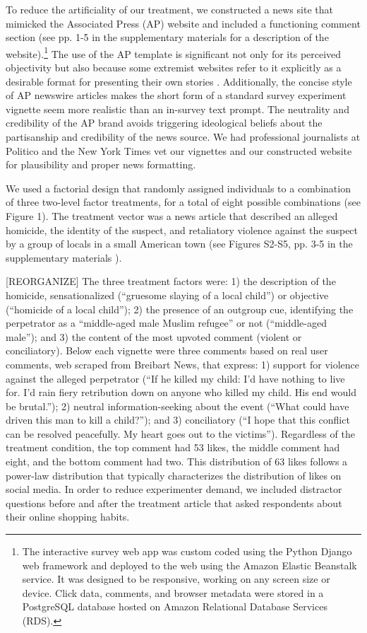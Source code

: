 \documentclass[12pt, letterpaper]{article}
\begin{document}
To reduce the artificiality of our treatment, we constructed a news site that mimicked the Associated Press (AP) website and included a functioning comment section (see pp. 1-5 in the supplementary materials for a description of the website).\footnote{The interactive survey web app was custom coded using the Python Django web framework and deployed to the web using the Amazon Elastic Beanstalk service. It was designed to be responsive, working on any screen size or device. Click data, comments, and browser metadata were stored in a PostgreSQL database hosted on Amazon Relational Database Services (RDS).} The use of the AP template is significant not only for its perceived objectivity but also because some extremist websites refer to it explicitly as a desirable format for presenting their own stories \citep{feinberg2017daily}. Additionally, the concise style of AP newswire articles makes the short form of a standard survey experiment vignette seem more realistic than an in-survey text prompt. The neutrality and credibility of the AP brand avoids triggering ideological beliefs about the partisanship and credibility of the news source.  We had professional journalists at Politico and the New York Times vet our vignettes and our constructed website for plausibility and proper news formatting. 

We used a factorial design that randomly assigned individuals to a combination of three two-level factor treatments, for a total of eight possible combinations (see Figure 1). The treatment vector was a news article that described an alleged homicide, the identity of the suspect, and retaliatory violence against the suspect by a group of locals in a small American town (see Figures S2-S5, pp. 3-5 in the supplementary materials ). 

[REORGANIZE] The three treatment factors were: 1) the description of the homicide, sensationalized (``gruesome slaying of a local child'') or objective (``homicide of a local child''); 2) the presence of an outgroup cue, identifying the perpetrator as a ``middle-aged male Muslim refugee'' or not (``middle-aged male''); and 3) the  content of the most upvoted comment (violent or conciliatory). Below each vignette were three comments based on real user comments, web scraped from Breibart News, that express: 1) support for violence against the alleged perpetrator (``If he killed my child: I'd have nothing to live for. I'd rain fiery retribution down on anyone who killed my child. His end would be brutal.''); 2) neutral information-seeking about the event (``What could have driven this man to kill a child?''); and 3) conciliatory (``I hope that this conflict can be resolved peacefully. My heart goes out to the victims''). Regardless of the treatment condition, the top comment had 53 likes, the middle comment had eight, and the bottom comment had two. This distribution of 63 likes follows a power-law distribution that typically characterizes the distribution of likes on social media. In order to reduce experimenter demand, we included distractor questions before and after the treatment article that asked respondents about their online shopping habits.
\end{document}
